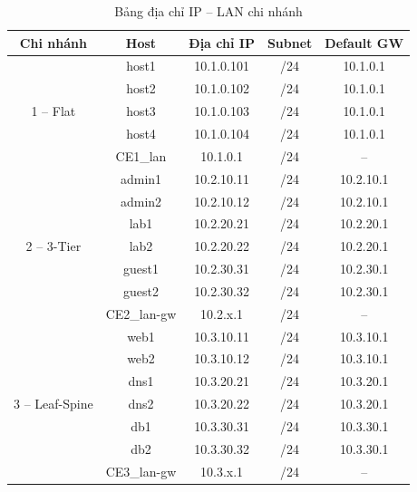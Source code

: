 \begin{table}[H]
    \centering
    \caption{Bảng địa chỉ IP -- LAN chi nhánh}
    \vspace{0.3cm}
    \small
    \begin{tabularx}{\textwidth}{|c|c|c|c|c|}
        \hline
        \textbf{Chi nhánh} & \textbf{Host} & \textbf{Địa chỉ IP} & \textbf{Subnet} & \textbf{Default GW} \\ \hline
        \multirow{5}{*}{1 -- Flat} & host1 & 10.1.0.101 & /24 & 10.1.0.1 \\ \cline{2-5}
                                    & host2 & 10.1.0.102 & /24 & 10.1.0.1 \\ \cline{2-5}
                                    & host3 & 10.1.0.103 & /24 & 10.1.0.1 \\ \cline{2-5}
                                    & host4 & 10.1.0.104 & /24 & 10.1.0.1 \\ \cline{2-5}
                                    & CE1\_lan & 10.1.0.1 & /24 & -- \\ \hline
        \multirow{7}{*}{2 -- 3-Tier} & admin1 & 10.2.10.11 & /24 & 10.2.10.1 \\ \cline{2-5}
                                      & admin2 & 10.2.10.12 & /24 & 10.2.10.1 \\ \cline{2-5}
                                      & lab1   & 10.2.20.21 & /24 & 10.2.20.1 \\ \cline{2-5}
                                      & lab2   & 10.2.20.22 & /24 & 10.2.20.1 \\ \cline{2-5}
                                      & guest1 & 10.2.30.31 & /24 & 10.2.30.1 \\ \cline{2-5}
                                      & guest2 & 10.2.30.32 & /24 & 10.2.30.1 \\ \cline{2-5}
                                      & CE2\_lan-gw & 10.2.x.1 & /24 & -- \\ \hline
        \multirow{7}{*}{3 -- Leaf-Spine} & web1 & 10.3.10.11 & /24 & 10.3.10.1 \\ \cline{2-5}
                                          & web2 & 10.3.10.12 & /24 & 10.3.10.1 \\ \cline{2-5}
                                          & dns1 & 10.3.20.21 & /24 & 10.3.20.1 \\ \cline{2-5}
                                          & dns2 & 10.3.20.22 & /24 & 10.3.20.1 \\ \cline{2-5}
                                          & db1  & 10.3.30.31 & /24 & 10.3.30.1 \\ \cline{2-5}
                                          & db2  & 10.3.30.32 & /24 & 10.3.30.1 \\ \cline{2-5}
                                          & CE3\_lan-gw & 10.3.x.1 & /24 & -- \\ \hline
    \end{tabularx}
    \label{tab:ip_lan}
\end{table}

